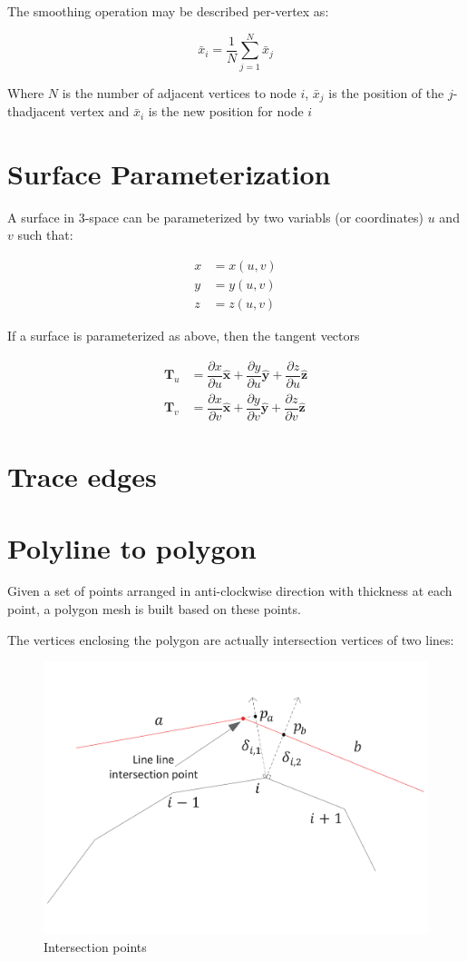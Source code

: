 The smoothing operation may be described per-vertex as:

\begin{equation}
\bar{x}_i = \dfrac{1}{N} \sum_{j=1}^{N} \bar{x}_j
\end{equation}

Where $ N $ is the number of adjacent vertices to node $ i $, $ \bar{x}_j $ is the position of the $ j $-thadjacent vertex and $ \bar{x}_i $ is the new position for node $ i $

\section{Surface Parameterization}
A surface in 3-space can be parameterized by two variabls (or coordinates) $ u $ and $ v $ such that:

\begin{align}
	x &= x(u,v) \\
	y &= y(u,v) \\
	z &= z(u,v)
\end{align}

If a surface is parameterized as above, then the tangent vectors

\begin{align*}
	\mathbf{T}_u &= \dfrac{\partial x}{\partial u} \hat{\mathbf{x}} + \dfrac{\partial y}{\partial u} \hat{\mathbf{y}} + \dfrac{\partial z}{\partial u} \hat{\mathbf{z}} \\
	\mathbf{T}_v &= \dfrac{\partial x}{\partial v} \hat{\mathbf{x}} + \dfrac{\partial y}{\partial v} \hat{\mathbf{y}} + \dfrac{\partial z}{\partial v} \hat{\mathbf{z}}
\end{align*}


\section{Trace edges}

\section{Polyline to polygon}
Given a set of points arranged in anti-clockwise direction with thickness at each point, a polygon mesh is built based on these points.

The vertices enclosing the polygon are actually intersection vertices of two lines:

\begin{figure}[h!]
	\centering
	\includegraphics[width=0.5\linewidth]{Figures/polyline_intersectionPoint}
	\caption{Intersection points}
	\label{fig:polylineintersectionpoint}
\end{figure}

